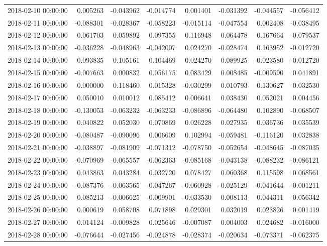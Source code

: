 \begin{tabular}{lrrrrrrr}
2018-02-10 00:00:00 & 0.005263 & -0.043962 & -0.014774 & 0.001401 & -0.031392 & -0.044557 & -0.056412 \\
2018-02-11 00:00:00 & -0.088301 & -0.028367 & -0.058223 & -0.015114 & -0.047554 & 0.002408 & -0.038495 \\
2018-02-12 00:00:00 & 0.061703 & 0.059892 & 0.097355 & 0.116948 & 0.064478 & 0.167664 & 0.079537 \\
2018-02-13 00:00:00 & -0.036228 & -0.048963 & -0.042007 & 0.024270 & -0.028474 & 0.163952 & -0.012720 \\
2018-02-14 00:00:00 & 0.093835 & 0.105161 & 0.104469 & 0.024270 & 0.089925 & -0.023580 & -0.012720 \\
2018-02-15 00:00:00 & -0.007663 & 0.000832 & 0.056175 & 0.083429 & 0.008485 & -0.009590 & 0.041891 \\
2018-02-16 00:00:00 & 0.000000 & 0.118460 & 0.015328 & -0.030299 & 0.010793 & 0.130627 & 0.032530 \\
2018-02-17 00:00:00 & 0.050010 & 0.010012 & 0.085412 & 0.006641 & 0.038430 & 0.052021 & 0.004456 \\
2018-02-18 00:00:00 & -0.130053 & -0.063232 & -0.063233 & -0.086896 & -0.064480 & 0.102890 & -0.068507 \\
2018-02-19 00:00:00 & 0.040822 & 0.052030 & 0.070869 & 0.026228 & 0.027935 & 0.036736 & 0.035539 \\
2018-02-20 00:00:00 & -0.080487 & -0.090096 & 0.006609 & 0.102994 & -0.059481 & -0.116120 & 0.032838 \\
2018-02-21 00:00:00 & -0.038897 & -0.081909 & -0.071312 & -0.078750 & -0.052654 & -0.048645 & -0.087035 \\
2018-02-22 00:00:00 & -0.070969 & -0.065557 & -0.062363 & -0.085168 & -0.043138 & -0.088232 & -0.086121 \\
2018-02-23 00:00:00 & 0.043863 & 0.043284 & 0.032720 & 0.078427 & 0.060368 & 0.115598 & 0.068561 \\
2018-02-24 00:00:00 & -0.087376 & -0.063565 & -0.047267 & -0.060928 & -0.025129 & -0.041644 & -0.001211 \\
2018-02-25 00:00:00 & 0.085213 & -0.006625 & -0.009901 & -0.033530 & 0.008113 & 0.044311 & 0.056342 \\
2018-02-26 00:00:00 & 0.000619 & 0.058708 & 0.071898 & 0.029301 & 0.032019 & 0.023826 & 0.001419 \\
2018-02-27 00:00:00 & 0.014124 & -0.009828 & 0.025646 & -0.007087 & 0.004003 & 0.024682 & -0.016000 \\
2018-02-28 00:00:00 & -0.076644 & -0.027456 & -0.024878 & -0.028374 & -0.020634 & -0.073371 & -0.062375 \\

\end{tabular}
